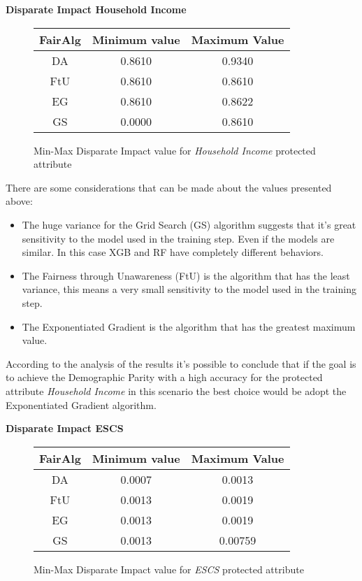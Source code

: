 \newpage
\textbf{Disparate Impact Household Income}
\begin{figure}[H]
    \centering
    \begin{tabular}{|c|c|c|}
        \hline
        \textbf{FairAlg} & \textbf{Minimum value} & \textbf{Maximum Value} \\
        \hline
        DA & 0.8610 & 0.9340 \\
        \hline
        FtU & 0.8610 & 0.8610 \\
        \hline
        EG & 0.8610 & 0.8622 \\
        \hline
        GS & 0.0000 & 0.8610 \\
        \hline
    \end{tabular}
    \caption{Min-Max Disparate Impact value for \emph{Household Income} protected attribute}
\end{figure}

There are some considerations that can be made about the values presented above:

\begin{itemize}

    \item The huge variance for the Grid Search (GS) algorithm suggests that it's great sensitivity to the model used in the training step. Even if the models are similar. In this case XGB and RF have completely different behaviors.

    \item The Fairness through Unawareness (FtU) is the algorithm that has the least variance, this means a very small sensitivity to the model used in the training step.

    \item The Exponentiated Gradient is the algorithm that has the greatest maximum value.

\end{itemize}

According to the analysis of the results it's possible to conclude that if the goal is to achieve the Demographic Parity with a high accuracy for the protected attribute \emph{Household Income} in this scenario the best choice would be adopt the Exponentiated Gradient algorithm.


\newpage
\textbf{Disparate Impact ESCS}
\begin{figure}[H]
    \centering
    \begin{tabular}{|c|c|c|}
        \hline
        \textbf{FairAlg} & \textbf{Minimum value} & \textbf{Maximum Value} \\
        \hline
        DA & 0.0007 & 0.0013 \\
        \hline
        FtU & 0.0013 & 0.0019 \\
        \hline
        EG & 0.0013 & 0.0019 \\
        \hline
        GS & 0.0013 & 0.00759 \\
        \hline
    \end{tabular}
    \caption{Min-Max Disparate Impact value for \emph{ESCS} protected attribute}
\end{figure}

